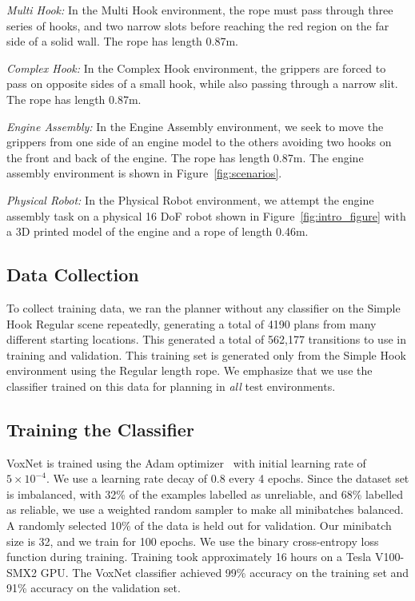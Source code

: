 \textit{Multi Hook:}
In the Multi Hook environment, the rope must pass through three series of hooks, and two narrow slots before reaching the red region on the far side of a solid wall. The rope has length 0.87m.

\textit{Complex Hook:}
In the Complex Hook environment, the grippers are forced to pass on opposite sides of a small hook, while also passing through a narrow slit. The rope has length 0.87m.

\textit{Engine Assembly:}
In the Engine Assembly environment, we seek to move the grippers from one side of an engine model \cite{EngineAssemblyTumber} to the others avoiding two hooks on the front and back of the engine. The rope has length 0.87m.
 The engine assembly environment is shown in Figure~\ref{fig:scenarios}.

\textit{Physical Robot:}
In the Physical Robot environment, we attempt the engine assembly task on a physical 16 DoF robot shown in Figure~\ref{fig:intro_figure} with a 3D printed model of the engine and a rope of length 0.46m.


\subsection{Data Collection}
\label{sec:ropedata}
To collect training data, we ran the planner without any classifier on the Simple Hook Regular scene repeatedly, generating a total of 4190 plans from many different starting locations. This generated a total of 562,177 transitions to use in training and validation. This training set is generated only from the Simple Hook environment using the Regular length rope. We emphasize that we use the classifier trained on this data for planning in \textit{all} test environments.


\subsection{Training the Classifier}
VoxNet is trained using the Adam optimizer~\cite{adamOptimizer2015} with initial learning rate of $5 \times 10^{-4}$. We use a learning rate decay of $0.8$ every 4 epochs. Since the dataset set is imbalanced, with 32\% of the examples labelled as unreliable, and 68\% labelled as reliable, we use a weighted random sampler to make all minibatches balanced. A randomly selected 10\% of the data is held out for validation. Our minibatch size is 32, and we train for 100 epochs. We use the binary cross-entropy loss function during training. Training took approximately 16 hours on a Tesla V100-SMX2 GPU. The VoxNet classifier achieved 99\% accuracy on the training set and 91\% accuracy on the validation set. 
